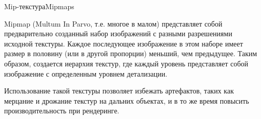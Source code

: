 \documentclass{beamer}
\begin{document}
	\begin{frame}{Mip-текстура}{Mipmaps}
		
		Mipmap (Multum In Parvo, т.е. многое в малом) представляет собой предварительно созданный набор изображений с разными разрешениями исходной текстуры. Каждое последующее изображение в этом наборе имеет размер в половину (или в другой пропорции) меньший, чем предыдущее. Таким образом, создается иерархия текстур, где каждый уровень представляет собой изображение с определенным уровнем детализации.

		Использование такой текстуры позволяет избежать артефактов, таких как мерцание и дрожание текстур на дальних объектах, и в то же время повысить производительность при рендеринге.



	\end{frame}
\end{document}

